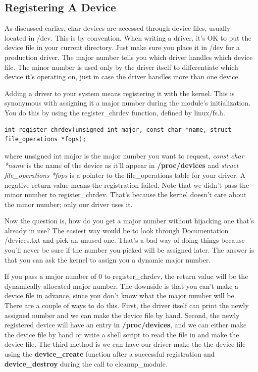 \documentclass[11pt]{article}
\begin{document}
\subsection*{Registering A Device}
\label{sec-6-3}
As discussed earlier, char devices are accessed through device files, usually located in /dev. This is by convention. When writing a driver, it's OK to put the device file in your current directory. Just make sure you place it in /dev for a production driver. The major number tells you which driver handles which device file. The minor number is used only by the driver itself to differentiate which device it's operating on, just in case the driver handles more than one device.

Adding a driver to your system means registering it with the kernel. This is synonymous with assigning it a major number during the module's initialization. You do this by using the register\_chrdev function, defined by linux/fs.h.

\begin{verbatim}
int register_chrdev(unsigned int major, const char *name, struct file_operations *fops);
\end{verbatim}

where unsigned int major is the major number you want to request, \emph{const char *name} is the name of the device as it'll appear in \textbf{/proc/devices} and \emph{struct file\_operations *fops} is a pointer to the file\_operations table for your driver. A negative return value means the registration failed. Note that we didn't pass the minor number to register\_chrdev. That's because the kernel doesn't care about the minor number; only our driver uses it.

Now the question is, how do you get a major number without hijacking one that's already in use? The easiest way would be to look through Documentation /devices.txt and pick an unused one. That's a bad way of doing things because you'll never be sure if the number you picked will be assigned later. The answer is that you can ask the kernel to assign you a dynamic major number.

If you pass a major number of 0 to register\_chrdev, the return value will be the dynamically allocated major number. The downside is that you can't make a device file in advance, since you don't know what the major number will be. There are a couple of ways to do this. First, the driver itself can print the newly assigned number and we can make the device file by hand. Second, the newly registered device will have an entry in \textbf{/proc/devices}, and we can either make the device file by hand or write a shell script to read the file in and make the device file. The third method is we can have our driver make the the device file using the \textbf{device\_create} function after a successful registration and \textbf{device\_destroy} during the call to cleanup\_module.
\end{document}
